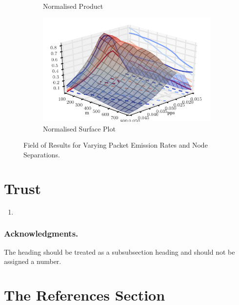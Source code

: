 \documentclass[runningheads,a4paper]{llncs}
\begin{document}
\begin{figure}
\begin{subfigure}{.5\textwidth}
  \caption{Normalised Product}
  \label{fig:2d_norm_prod}
\end{subfigure}
\begin{subfigure}{.5\textwidth}
\centering
  \includegraphics[width=.8\linewidth]{img/3d_normed_product_static.pdf}
  \caption{Normalised Surface Plot}
  \label{fig:3d_norm_prod}
\end{subfigure}
\caption{Field of Results for Varying Packet Emission Rates and Node Separations.}
\label{fig:2d_delay_throughput}
\end{figure}

\section{Trust}
\begin{enumerate}
  \item 
\end{enumerate}

\subsubsection*{Acknowledgments.} The heading should be treated as a
subsubsection heading and should not be assigned a number.

\section{The References Section}\label{references}
\end{document}

